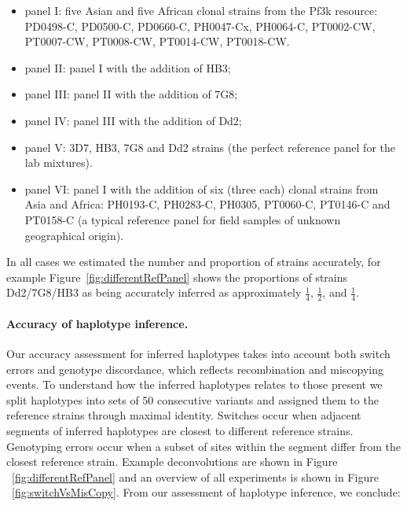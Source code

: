 \documentclass{nature}
\begin{document}
\begin{itemize}

\item panel I: five Asian and five African clonal strains from the Pf3k\cite{Pf3k2016} resource: {\textmd PD0498-C}, {\textmd PD0500-C}, {\textmd PD0660-C}, {\textmd PH0047-Cx}, {\textmd PH0064-C}, {\textmd PT0002-CW}, {\textmd PT0007-CW}, {\textmd PT0008-CW}, {\textmd PT0014-CW}, {\textmd PT0018-CW}.

\item panel II: panel I with the addition of HB3;

\item panel III: panel II with the addition of 7G8;

\item panel IV: panel III with the addition of Dd2;

\item panel V: 3D7, HB3, 7G8 and Dd2 strains (the perfect reference panel for the lab mixtures).

\item panel VI: panel I with the addition of six (three each) clonal strains from Asia and Africa: {\textmd PH0193-C}, {\textmd PH0283-C}, {\textmd PH0305}, {\textmd PT0060-C}, {\textmd PT0146-C} and {\textmd PT0158-C} (a typical reference panel for field samples of unknown geographical origin).

\end{itemize}


\noindent In all cases we estimated the number and proportion of strains accurately, for example Figure~\ref{fig:differentRefPanel} shows the proportions of strains Dd2/7G8/HB3 as being accurately inferred as approximately $\frac{1}{4}$, $\frac{1}{2}$, and $\frac{1}{4}$.



\paragraph{Accuracy of haplotype inference.}
Our accuracy assessment for inferred haplotypes takes into account both switch errors and genotype discordance, which reflects recombination and miscopying events. To understand how the inferred haplotypes relates to those present we split haplotypes into sets of 50 consecutive variants and assigned them to the reference strains through maximal identity.  Switches occur when adjacent segments of inferred haplotypes are closest to different reference strains.  Genotyping errors occur when a subset of sites within the segment differ from the closest reference strain.  Example deconvolutions are shown in Figure ~\ref{fig:differentRefPanel} and an overview of all experiments is shown in Figure ~\ref{fig:switchVsMisCopy}.  From our assessment of haplotype inference, we conclude:
\end{document}
